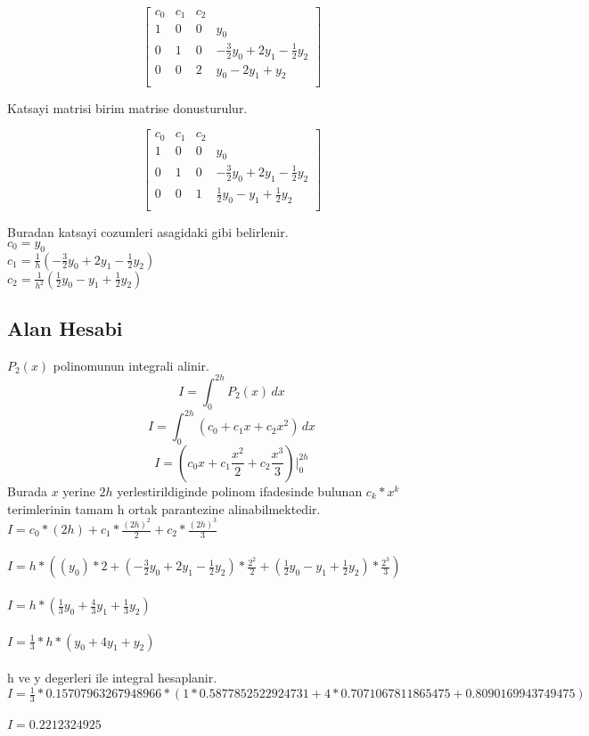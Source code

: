 \documentclass{article}
\begin{document}
\begin{center}
$$ \left[\begin{array}{rrr|r}
c_{0} & c_{1} & c_{2}\\
1 & 0 & 0 & y_{0}\\
0 & 1 & 0 & -\frac{3}{2}y_{0}+2y_{1}-\frac{1}{2}y_{2}\\
0 & 0 & 2 & y_{0}-2y_{1}+y_{2}\\
\end{array}\right] $$
\end{center}
Katsayi matrisi birim matrise donusturulur.
\begin{center}
$$ \left[\begin{array}{rrr|r}
c_{0} & c_{1} & c_{2}\\
1 & 0 & 0 & y_{0}\\
0 & 1 & 0 & -\frac{3}{2}y_{0}+2y_{1}-\frac{1}{2}y_{2}\\
0 & 0 & 1 & \frac{1}{2}y_{0}-y_{1}+\frac{1}{2}y_{2}\\
\end{array}\right] $$
\end{center}
Buradan katsayi cozumleri asagidaki gibi belirlenir.\\
$\displaystyle c_{0}=y_{0}$\\
$\displaystyle c_{1}=\frac{1}{h}(-\frac{3}{2}y_{0}+2y_{1}-\frac{1}{2}y_{2})$\\
$\displaystyle c_{2}=\frac{1}{h^{2}}(\frac{1}{2}y_{0}-y_{1}+\frac{1}{2}y_{2})$\\
\subsection{Alan Hesabi}
$P_{2}(x)$ polinomunun integrali alinir.\\
\[ I=\int_{0}^{2h} P_{2}(x) \,dx \]
\[ I=\int_{0}^{2h} (c_{0}+c_{1}x+c_{2}x^{2}) \,dx \]
\[ I=(c_{0}x+c_{1}\frac{x^{2}}{2}+c_{2}\frac{x^{3}}{3})\bigg\vert_{0}^{2h} \]
Burada $x$ yerine $2h$ yerlestirildiginde polinom ifadesinde bulunan $c_{k}*x^{k}$ terimlerinin tamam h ortak parantezine alinabilmektedir.\\
$\displaystyle I=c_{0}*(2h)+c_{1}*\frac{(2h)^{2}}{2}+c_{2}*\frac{(2h)^{3}}{3}$\\\\
$\displaystyle I=h*((y_{0})*2+(-\frac{3}{2}y_{0}+2y_{1}-\frac{1}{2}y_{2})*\frac{2^{2}}{2}+(\frac{1}{2}y_{0}-y_{1}+\frac{1}{2}y_{2})*\frac{2^{3}}{3})$\\\\
$\displaystyle I=h*(\frac{1}{3}y_{0}+\frac{4}{3}y_{1}+\frac{1}{3}y_{2})$\\\\
$\displaystyle I=\frac{1}{3}*h*(y_{0}+4y_{1}+y_{2})$\\\\
h ve y degerleri ile integral hesaplanir.\\
$\displaystyle I=\frac{1}{3}*0.15707963267948966*(1*0.5877852522924731+4*0.7071067811865475+0.8090169943749475)$\\\\
$\displaystyle I=0.2212324925$\\\\
\end{document}
